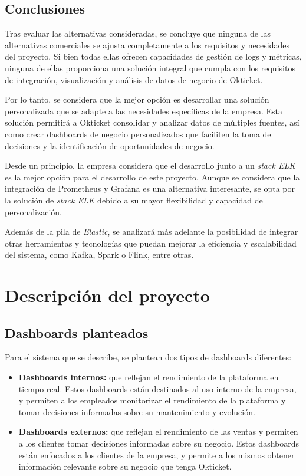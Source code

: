 \subsection{Conclusiones}
Tras evaluar las alternativas consideradas, se concluye que ninguna de las
alternativas comerciales se ajusta completamente a los requisitos y necesidades
del proyecto. Si bien todas ellas ofrecen capacidades de gestión de logs y
métricas, ninguna de ellas proporciona una solución integral que cumpla con los
requisitos de integración, visualización y análisis de datos de negocio de
Okticket.

Por lo tanto, se considera que la mejor opción es desarrollar una solución
personalizada que se adapte a las necesidades específicas de la empresa. Esta
solución permitirá a Okticket consolidar y analizar datos de múltiples fuentes,
así como crear dashboards de negocio personalizados que faciliten la toma de
decisiones y la identificación de oportunidades de negocio.

Desde un principio, la empresa considera que el desarrollo junto a un
\textit{stack ELK} es la mejor opción para el desarrollo de este proyecto.
Aunque se considera que la integración de Prometheus y Grafana es una
alternativa interesante, se opta por la solución de \textit{stack ELK} debido a
su mayor flexibilidad y capacidad de personalización.

Además de la pila de \textit{Elastic}, se analizará más adelante la posibilidad
de integrar otras herramientas y tecnologías que puedan mejorar la eficiencia y
escalabilidad del sistema, como Kafka, Spark o Flink, entre otras.


\newpage{}
\section{Descripción del proyecto}\label{sec:descripcion}
\subsection{Dashboards planteados}
Para el sistema que se describe, se plantean dos tipos de dashboards diferentes:

\begin{itemize}
	\item \textbf{Dashboards internos:} que reflejan el rendimiento de la
		plataforma en tiempo real. Estos dashboards están destinados al uso
		interno de la empresa, y permiten a los empleados monitorizar el
		rendimiento de la plataforma y tomar decisiones informadas sobre su
		mantenimiento y evolución.
	\item \textbf{Dashboards externos:} que reflejan el rendimiento de las
		ventas y permiten a los clientes tomar decisiones informadas sobre su
		negocio. Estos dashboards están enfocados a los clientes de la empresa,
		y permite a los mismos obtener información relevante sobre su negocio
		que tenga Okticket.
\end{itemize}
